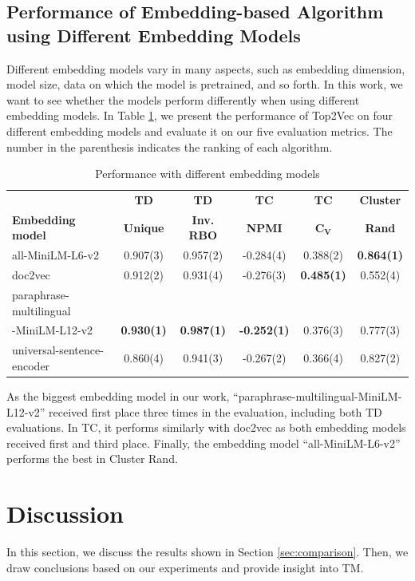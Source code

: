 \documentclass[11pt]{article}
\begin{document}
\subsection{Performance of Embedding-based Algorithm using Different Embedding Models}
Different embedding models vary in many aspects, such as embedding dimension, model size, data on which the model is pretrained, and so forth. In this work, we want to see whether the models perform differently when using different embedding models. In Table \ref{tab:datasets embeddings}, we present the performance of Top2Vec on four different embedding models and evaluate it on our five evaluation metrics. The number in the parenthesis indicates the ranking of each algorithm.

\begin{table}[ht]
\centering
\begin{adjustbox}{width=0.5\textwidth}
\begin{tabular}{lccccc}
\hline
\textbf{} & \textbf{TD} & \textbf{TD} & \textbf{TC} & \textbf{TC} & \textbf{Cluster}\\
\textbf{Embedding model} & \textbf{Unique} & \textbf{Inv. RBO} & \textbf{NPMI} & \textbf{C${_\mathbf{V}}$} & \textbf{Rand}\\
\hline
all-MiniLM-L6-v2 & 0.907(3) & 0.957(2) & -0.284(4) & 0.388(2) & \textbf{0.864(1)}\\ 
doc2vec & 0.912(2) & 0.931(4) & -0.276(3) & \textbf{0.485(1)} & 0.552(4)\\
paraphrase-multilingual & {} & {} & {} & {} & {}\\
-MiniLM-L12-v2 & \textbf{0.930(1)} & \textbf{0.987(1)} & \textbf{-0.252(1)} & 0.376(3) & 0.777(3)\\
universal-sentence-encoder & 0.860(4) & 0.941(3) & -0.267(2) & 0.366(4) & 0.827(2)\\
\hline
\end{tabular}
\end{adjustbox}
\caption{Performance with different embedding models}
\label{tab:datasets embeddings}
\end{table}

As the biggest embedding model in our work, “paraphrase-multilingual-MiniLM-L12-v2” received first place three times in the evaluation, including both TD evaluations. In TC, it performs similarly with doc2vec as both embedding models received first and third place. Finally, the embedding model “all-MiniLM-L6-v2” performs the best in Cluster Rand.

\section{Discussion}
\label{sec:discussion}
In this section, we discuss the results shown in Section \ref{sec:comparison}. Then, we draw conclusions based on our experiments and provide insight into TM.
\end{document}
